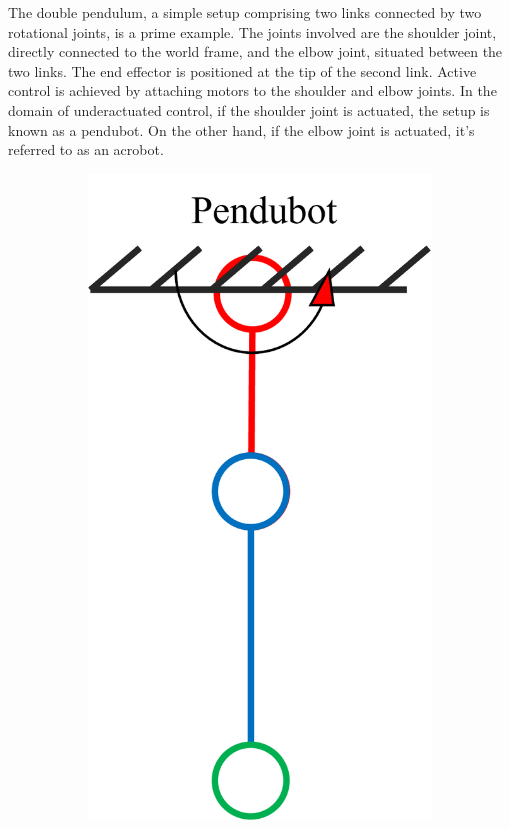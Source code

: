 The double pendulum, a simple setup comprising two links connected by two rotational joints, is a prime example. The joints involved are the shoulder joint, directly connected to the world frame, and the elbow joint, situated between the two links. The end effector is positioned at the tip of the second link. Active control is achieved by attaching motors to the shoulder and elbow joints. In the domain of underactuated control, if the shoulder joint is actuated, the setup is known as a pendubot. On the other hand, if the elbow joint is actuated, it's referred to as an acrobot.

\begin{figure}[htbp]
    \centering
    \begin{subfigure}[b]{0.2\textwidth}
        \includegraphics[width=\textwidth]{figures/pendubot_explained.png}

\end{subfigure}
\end{figure}
